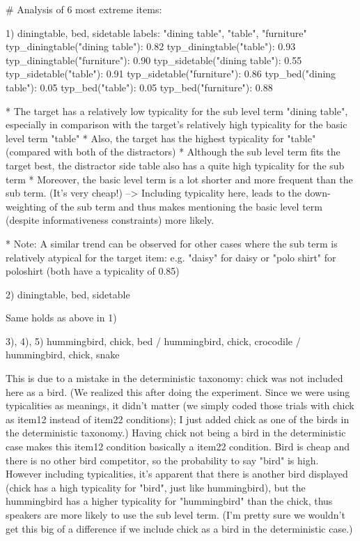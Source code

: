 # Analysis of 6 most extreme items:

1) diningtable, bed, sidetable
	labels: "dining table", "table", "furniture"
	typ_diningtable("dining table"): 0.82
	typ_diningtable("table"): 0.93
	typ_diningtable("furniture"): 0.90
	typ_sidetable("dining table"): 0.55
	typ_sidetable("table"): 0.91
	typ_sidetable("furniture"): 0.86
	typ_bed("dining table"): 0.05
	typ_bed("table"): 0.05
	typ_bed("furniture"): 0.88

	* The target has a relatively low typicality for the sub level term "dining table", especially in comparison with the target's relatively high typicality for the basic level term "table" 
	* Also, the target has the highest typicality for "table" (compared with both of the distractors)
	* Although the sub level term fits the target best, the distractor side table also has a quite high typicality for the sub term 	* Moreover, the basic level term is a lot shorter and more frequent than the sub term. (It's very cheap!)
	--> Including typicality here, leads to the down-weighting of the sub term and thus makes mentioning the basic level term (despite informativeness constraints) more likely.

	* Note: A similar trend can be observed for other cases where the sub term is relatively atypical for the target item: e.g. "daisy" for daisy or "polo shirt" for poloshirt (both have a typicality of 0.85)

2) diningtable, bed, sidetable

	Same holds as above in 1)

3), 4), 5) hummingbird, chick, bed / hummingbird, chick, crocodile / hummingbird, chick, snake

	This is due to a mistake in the deterministic taxonomy: chick was not included here as a bird. (We realized this after doing the experiment. Since we were using typicalities as meanings, it didn't matter (we simply coded those trials with chick as item12 instead of item22 conditions); I just added chick as one of the birds in the deterministic taxonomy.) 
	Having chick not being a bird in the deterministic case makes this item12 condition basically a item22 condition. Bird is cheap and there is no other bird competitor, so the probability to say "bird" is high.
	However including typicalities, it's apparent that there is another bird displayed (chick has a high typicality for "bird", just like hummingbird), but the hummingbird has a higher typicality for "hummingbird" than the chick, thus speakers are more likely to use the sub level term.
	(I'm pretty sure we wouldn't get this big of a difference if we include chick as a bird in the deterministic case.)

